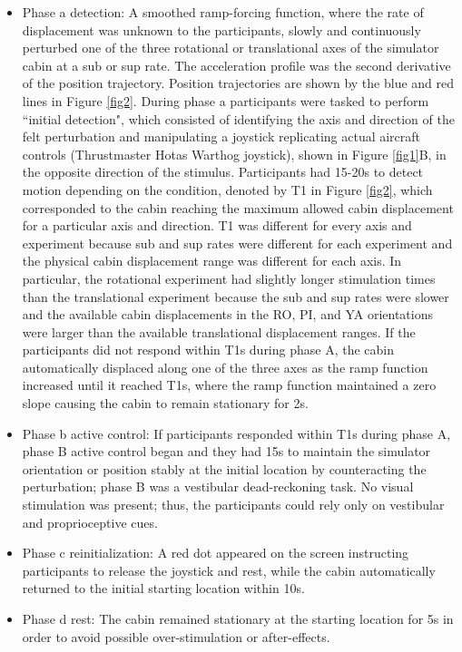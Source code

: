 \documentclass{ieeeaccess}
\begin{document}
\begin{itemize}
\item Phase a detection: A smoothed ramp-forcing function, where the rate of displacement was unknown to the participants, slowly and continuously perturbed one of the three rotational or translational axes of the simulator cabin at a sub or sup rate. The acceleration profile was the second derivative of the position trajectory. Position trajectories are shown by the blue and red lines in Figure \ref{fig2}. During phase a participants were tasked to perform ``initial detection", which consisted of identifying the axis and direction of the felt perturbation and manipulating a joystick replicating actual aircraft controls (Thrustmaster Hotas Warthog joystick), shown in Figure \ref{fig1}B, in the opposite direction of the stimulus. Participants had 15-20s to detect motion depending on the condition, denoted by T1 in Figure \ref{fig2}, which corresponded to the cabin reaching the maximum allowed cabin displacement for a particular axis and direction. T1 was different for every axis and experiment because sub and sup rates were different for each experiment and the physical cabin displacement range was different for each axis. In particular, the rotational experiment had slightly longer stimulation times than the translational experiment because the sub and sup rates were slower and the available cabin displacements in the RO, PI, and YA orientations were larger than the available translational displacement ranges. If the participants did not respond within T1s during phase A, the cabin automatically displaced along one of the three axes as the ramp function increased until it reached T1s, where the ramp function maintained a zero slope causing the cabin to remain stationary for 2s.
\item Phase b active control: If participants responded within T1s during phase A, phase B active control began and they had 15s to maintain the simulator orientation or position stably at the initial location by counteracting the perturbation; phase B was a vestibular dead-reckoning task. No visual stimulation was present; thus, the participants could rely only on vestibular and proprioceptive cues.
\item Phase c reinitialization: A red dot appeared on the screen instructing participants to release the joystick and rest, while the cabin automatically returned to the initial starting location within 10s.
\item Phase d rest: The cabin remained stationary at the starting location for 5s in order to avoid possible over-stimulation or after-effects.
\end{itemize}
\end{document}
